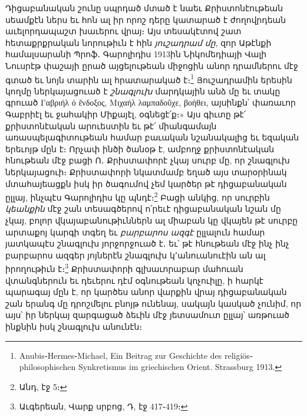 \documentclass{article}
\begin{document}
{Դիցաբանական շունը սպրդած մտած է նաեւ Քրիստոնէութեան սեամքէն ներս եւ հոն ալ իր որոշ դերը կատարած է ժողովրդեան աւելորդապաշտ խաւերու վրայ։ Այս տեսակէտով շատ հետաքրքրական նորութիւն է հին \emph{յուշադրամ մը}, զոր Աթէնքի համալսարանի Պրոֆ․ Գարոլիդիս 1913ին Նիկոմեդիայի Վալի Նուսրէթ փաշայի ըրած այցելութեան միջոցին անոր դրամներու մէջ գտած եւ նոյն տարին ալ հրատարակած է։\footnote{Anubis֊Hermes֊Michael, Ein Beitrag zur Geschichte des religiös֊philosophischen Synkretismus im griechischen Orient. Strassburg 1913.} Յուշադրամին երեսին կողմը ներկայացուած է \emph{շնագլուխ} մարդկային անձ մը եւ տակը գրուած Γαβριήλ ό ἔνδοξος, Μιχαήλ λαμπαδοῦχε, βοήθει, այսինքն՝ փառաւոր Գաբրիէլ եւ ջահակիր Միքայէլ, օգնեցէ՛ք։» Այս գիւտը թէ՛ քրիստոնէական արուեստին եւ թէ՛ միանգամայն առասպելագիտութեան համար բաւական նշանակալից եւ եզական երեւոյթ մըն է։ Որչափ ինծի ծանօթ է, ամբողջ քրիստոնէական հնութեան մէջ բացի Ո․ Քրիստափորէ չկայ սուրբ մը, որ շնագլուխ ներկայացուի։ Քրիստափորի նկատմամբ եղած այս տարօրինակ մտահայեացքն իսկ իր ծագումով չեմ կարծեր թէ դիցաբանական ըլլայ, ինչպէս Գարոլիդիս կը պնդէ։\footnote{Անդ, էջ 5։} Բացի անկից, որ սուրբին \emph{կեանքին} մէջ շան տեսագծերով ո՛րեւէ դիցաբանական նշան մը չկայ, բոլոր վկայաբանութիւններն ալ միաբան կը վկայեն թէ սուրբը արտաքոյ կարգի տգեղ եւ \emph{բարբարոս ազգէ} ըլլալուն համար յատկապէս շնագլուխ յորջորջուած է․ եւ՝ թէ հնութեան մէջ ինչ ինչ բարբարոս ազգեր յոյներէն շնագլուխ կ՚անուանուէին ան ալ իրողութիւն է։\footnote{Աւգերեան, Վարք սրբոց, Դ, էջ 417֊419։} Քրիստափորի գլխաւորաբար մահուան վտանգներուն եւ դեւերու դէմ օգնութեան կոչուիլը, ի հարկէ պարագայ մըն է, որ կարծես անոր վարքին վրայ դիցաբանական շան երանգ մը դրոշմելու բնոյթ ունենայ, սակայն կասկած չունիմ, որ այս՝ իր ներկայ զարգացած ձեւին մէջ յետսամուտ ըլլայ՝ առթուած ինքնին իսկ շնագլուխ անունէն։

}
\end{document}
